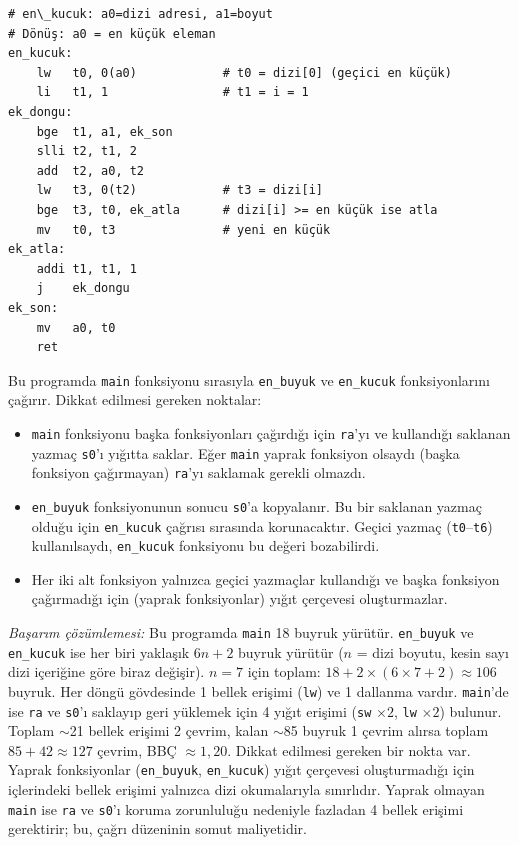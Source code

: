 \begin{ornek}[4.15]
\begin{lstlisting}[style=riscv]
# en\_kucuk: a0=dizi adresi, a1=boyut
# Dönüş: a0 = en küçük eleman
en_kucuk:
    lw   t0, 0(a0)            # t0 = dizi[0] (geçici en küçük)
    li   t1, 1                # t1 = i = 1
ek_dongu:
    bge  t1, a1, ek_son
    slli t2, t1, 2
    add  t2, a0, t2
    lw   t3, 0(t2)            # t3 = dizi[i]
    bge  t3, t0, ek_atla      # dizi[i] >= en küçük ise atla
    mv   t0, t3               # yeni en küçük
ek_atla:
    addi t1, t1, 1
    j    ek_dongu
ek_son:
    mv   a0, t0
    ret
\end{lstlisting}

Bu programda \texttt{main} fonksiyonu sırasıyla \texttt{en\_buyuk} ve \texttt{en\_kucuk} fonksiyonlarını çağırır. Dikkat edilmesi gereken noktalar:
\begin{itemize}
\item \texttt{main} fonksiyonu başka fonksiyonları çağırdığı için \texttt{ra}'yı ve kullandığı saklanan yazmaç \texttt{s0}'ı yığıtta saklar. Eğer \texttt{main} yaprak fonksiyon olsaydı (başka fonksiyon çağırmayan) \texttt{ra}'yı saklamak gerekli olmazdı.
\item \texttt{en\_buyuk} fonksiyonunun sonucu \texttt{s0}'a kopyalanır. Bu bir saklanan yazmaç olduğu için \texttt{en\_kucuk} çağrısı sırasında korunacaktır. Geçici yazmaç (\texttt{t0}--\texttt{t6}) kullanılsaydı, \texttt{en\_kucuk} fonksiyonu bu değeri bozabilirdi.
\item Her iki alt fonksiyon yalnızca geçici yazmaçlar kullandığı ve başka fonksiyon çağırmadığı için (yaprak fonksiyonlar) yığıt çerçevesi oluşturmazlar.
\end{itemize}

\emph{Başarım çözümlemesi:} Bu programda \texttt{main} 18 buyruk yürütür. \texttt{en\_buyuk} ve \texttt{en\_kucuk} ise her biri yaklaşık $6n + 2$ buyruk yürütür ($n$ = dizi boyutu, kesin sayı dizi içeriğine göre biraz değişir). $n = 7$ için toplam: $18 + 2 \times (6 \times 7 + 2) \approx 106$ buyruk. Her döngü gövdesinde 1 bellek erişimi (\texttt{lw}) ve 1 dallanma vardır. \texttt{main}'de ise \texttt{ra} ve \texttt{s0}'ı saklayıp geri yüklemek için 4 yığıt erişimi (\texttt{sw} $\times 2$, \texttt{lw} $\times 2$) bulunur. Toplam $\sim$21 bellek erişimi 2 çevrim, kalan $\sim$85 buyruk 1 çevrim alırsa toplam $85 + 42 \approx 127$ çevrim, BBÇ $\approx 1{,}20$. Dikkat edilmesi gereken bir nokta var. Yaprak fonksiyonlar (\texttt{en\_buyuk}, \texttt{en\_kucuk}) yığıt çerçevesi oluşturmadığı için içlerindeki bellek erişimi yalnızca dizi okumalarıyla sınırlıdır. Yaprak olmayan \texttt{main} ise \texttt{ra} ve \texttt{s0}'ı koruma zorunluluğu nedeniyle fazladan 4 bellek erişimi gerektirir; bu, çağrı düzeninin somut maliyetidir.
\end{ornek}

